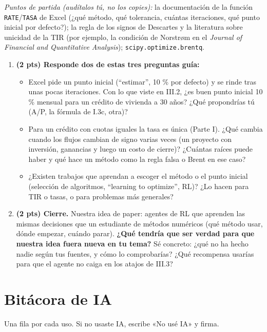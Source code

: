 \emph{Puntos de partida (audítalos tú, no los copies):} la documentación de la función \texttt{RATE}/\texttt{TASA} de Excel (¿qué método, qué tolerancia, cuántas iteraciones, qué punto inicial por defecto?); la regla de los signos de Descartes y la literatura sobre unicidad de la TIR (por ejemplo, la condición de Norstrøm en el \emph{Journal of Financial and Quantitative Analysis}); \texttt{scipy.optimize.brentq}.

\begin{enumerate}
\def\labelenumi{\arabic{enumi}.}
\setcounter{enumi}{2}
\tightlist
\item
  \textbf{(2 pts) Responde dos de estas tres preguntas guía:}

  \begin{itemize}
  \tightlist
  \item
    Excel pide un punto inicial (``estimar'', 10 \% por defecto) y se rinde tras unas pocas iteraciones. Con lo que viste en III.2, ¿es buen punto inicial 10 \% mensual para un crédito de vivienda a 30 años? ¿Qué propondrías tú (A/P, la fórmula de I.3c, otra)?
  \item
    Para un crédito con cuotas iguales la tasa es única (Parte I). ¿Qué cambia cuando los flujos cambian de signo varias veces (un proyecto con inversión, ganancias y luego un costo de cierre)? ¿Cuántas raíces puede haber y qué hace un método como la regla falsa o Brent en ese caso?
  \item
    ¿Existen trabajos que aprendan a escoger el método o el punto inicial (selección de algoritmos, ``learning to optimize'', RL)? ¿Lo hacen para TIR o tasas, o para problemas más generales?
  \end{itemize}
\item
  \textbf{(2 pts) Cierre.} Nuestra idea de paper: agentes de RL que aprenden las mismas decisiones que un estudiante de métodos numéricos (qué método usar, dónde empezar, cuándo parar). \textbf{¿Qué tendría que ser verdad para que nuestra idea fuera nueva en tu tema?} Sé concreto: ¿qué no ha hecho nadie según tus fuentes, y cómo lo comprobarías? ¿Qué recompensa usarías para que el agente no caiga en los atajos de III.3?
\end{enumerate}

\section{Bitácora de IA}

Una fila por cada uso. Si no usaste IA, escribe «No usé IA» y firma.

